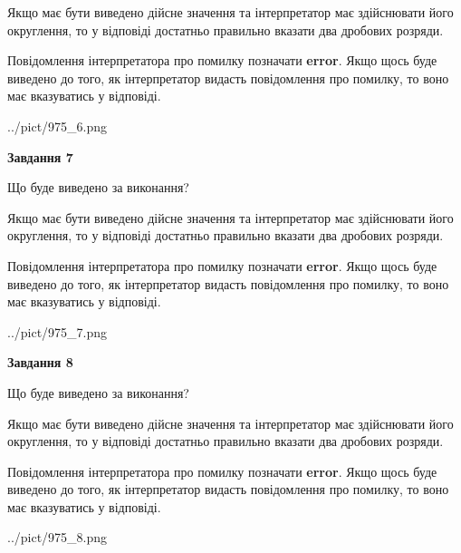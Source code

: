 \documentclass[12pt, ukrainian]{article}
\begin{document}
{\begin {Large}
Якщо має бути виведено дійсне значення та інтерпретатор має здійснювати його округлення, 
то у відповіді достатньо правильно вказати два дробових розряди.

Повідомлення інтерпретатора про помилку позначати \textbf{error}.
Якщо щось буде виведено до того, як інтерпретатор видасть повідомлення про помилку, 
то воно має вказуватись у відповіді. \par

\begin{center}
	{../pict/975_6.png}
\end{center}
\newpage

{\begin {center}\textbf{Завдання 7}\end {center}}\par
Що буде виведено за виконання? \par

Якщо має бути виведено дійсне значення та інтерпретатор має здійснювати його округлення, 
то у відповіді достатньо правильно вказати два дробових розряди.

Повідомлення інтерпретатора про помилку позначати \textbf{error}.
Якщо щось буде виведено до того, як інтерпретатор видасть повідомлення про помилку, 
то воно має вказуватись у відповіді. \par

\begin{center}
	{../pict/975_7.png}
\end{center}
\newpage

{\begin {center}\textbf{Завдання 8}\end {center}}\par
Що буде виведено за виконання? \par

Якщо має бути виведено дійсне значення та інтерпретатор має здійснювати його округлення, 
то у відповіді достатньо правильно вказати два дробових розряди.

Повідомлення інтерпретатора про помилку позначати \textbf{error}.
Якщо щось буде виведено до того, як інтерпретатор видасть повідомлення про помилку, 
то воно має вказуватись у відповіді. \par

\begin{center}
	{../pict/975_8.png}
\end{center}
\newpage


\end{Large}}
\end{document}
